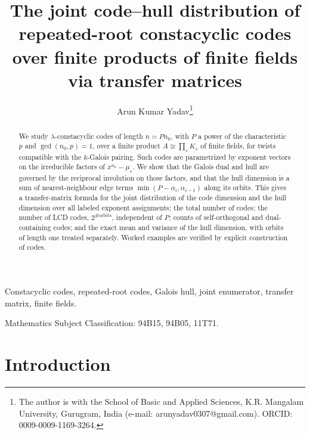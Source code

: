 \documentclass[10pt,journal,draftclsnofoot,onecolumn]{IEEEtran}
\title{The joint code--hull distribution of repeated-root constacyclic codes
over finite products of finite fields via transfer matrices}
\author{Arun Kumar Yadav\thanks{The author is with the School of Basic and Applied Sciences, K.R. Mangalam University, Gurugram, India (e-mail: arunyadav0307@gmail.com). ORCID: 0009-0009-1169-3264.}}
\theoremstyle{definition}
\theoremstyle{remark}
\begin{document}
\maketitle

\begin{abstract}
We study \(\lambda\)-constacyclic codes of length \(n = P n_0\), with
\(P\) a power of the characteristic \(p\) and \(\gcd(n_0, p) = 1\), over a
finite product \(A \cong \prod_s K_s\) of finite fields, for twists
compatible with the \(k\)-Galois pairing. Such codes are parametrized by
exponent vectors on the irreducible factors of \(x^{n_0} - \mu_s\). We
show that the Galois dual and hull are governed by the reciprocal
involution on those factors, and that the hull dimension is a sum of
nearest-neighbour edge terms \(\min(P - \alpha_i, \alpha_{i-1})\) along
its orbits. This gives a transfer-matrix formula for the joint
distribution of the code dimension and the hull dimension over all
labeled exponent assignments; the total number of codes; the number of
LCD codes, \(2^{\#\mathrm{orbits}}\), independent of \(P\); counts of
self-orthogonal and dual-containing codes; and the exact mean and
variance of the hull dimension, with orbits of length one treated
separately. Worked examples are verified by explicit construction of
codes.
\end{abstract}

\begin{IEEEkeywords}
Constacyclic codes, repeated-root codes, Galois hull, joint enumerator, transfer matrix, finite fields.
\end{IEEEkeywords}

\noindent Mathematics Subject Classification: 94B15, 94B05, 11T71.

\section{Introduction}
\end{document}
